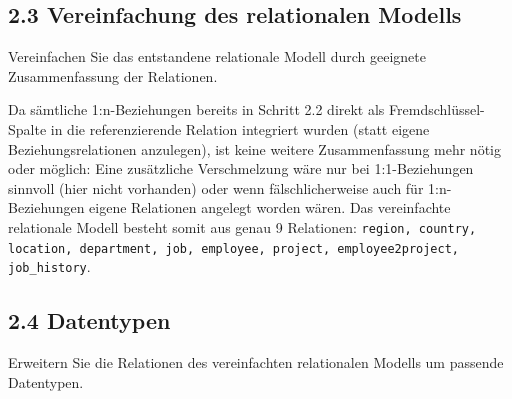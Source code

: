 \documentclass[11pt,a4paper]{article}
\begin{document}
\subsection*{2.3 \quad Vereinfachung des relationalen Modells}
Vereinfachen Sie das entstandene relationale Modell durch geeignete Zusammenfassung der Relationen.

\begin{loesung}
Da s\"amtliche 1:n-Beziehungen bereits in Schritt 2.2 direkt als Fremdschl\"ussel-Spalte in die referenzierende Relation integriert wurden (statt eigene Beziehungsrelationen anzulegen), ist keine weitere Zusammenfassung mehr n\"otig oder m\"oglich: Eine zus\"atzliche Verschmelzung w\"are nur bei 1:1-Beziehungen sinnvoll (hier nicht vorhanden) oder wenn f\"alschlicherweise auch f\"ur 1:n-Beziehungen eigene Relationen angelegt worden w\"aren. Das vereinfachte relationale Modell besteht somit aus genau 9 Relationen: \texttt{region, country, location, department, job, employee, project, employee2project, job\_history}.
\end{loesung}

\subsection*{2.4 \quad Datentypen}
Erweitern Sie die Relationen des vereinfachten relationalen Modells um passende Datentypen.
\end{document}
